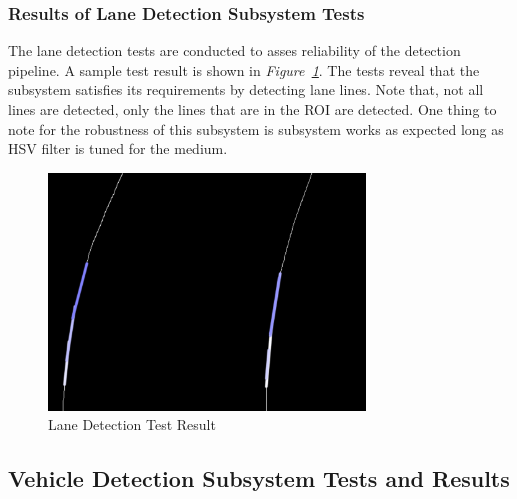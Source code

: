 \documentclass[a4paper,12pt]{article}
\begin{document}
\subsubsection*{Results of Lane Detection Subsystem Tests}

	The lane detection tests are conducted to asses reliability of the detection pipeline. A sample test result is shown in \textit{Figure~\ref{fig:laneD_test}}. The tests reveal that the subsystem satisfies its requirements by detecting lane lines. Note that, not all lines are detected, only the lines that are in the ROI are detected. One thing to note for the robustness of this subsystem is subsystem works as expected long as HSV filter is tuned for the medium.


	\begin{figure}[h]
		\includegraphics[width=0.75\textwidth,center]{images/laneD_test}
		\caption{Lane Detection Test Result \label{fig:laneD_test} }
	\end{figure}






\subsection {Vehicle Detection Subsystem Tests and Results}\label{sect:vhd}
\end{document}
